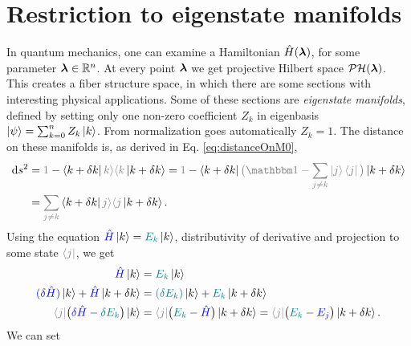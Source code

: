 \section{Restriction to eigenstate manifolds}
In quantum mechanics, one can examine a Hamiltonian $\hat{H}({\bm\lambda})$, for some parameter ${\bm\lambda}\in \mathbb{R}^n$. At every point ${\bm\lambda}$ we get projective Hilbert space $\mathcal{PH}({\bm\lambda})$. This creates a fiber structure space, in which there are some sections with interesting physical applications. Some of these sections are \emph{eigenstate manifolds}, defined by setting only one non-zero coefficient $Z_k$ in eigenbasis $\ket{\psi}=\sum_{k=0}^n Z_k \ket{k}$. From normalization goes automatically $Z_k=1$. The distance on these manifolds is, as derived in Eq. \ref{eq:distanceOnM0},
\begin{equation}
    \begin{split}
        \d s^2 &= \textcolor{gray}{1}-\bra{k+\delta k}\textcolor{gray}{k\rangle \langle k}\ket{k+\delta k}=\textcolor{gray}{1}-\bra{k+\delta k}\textcolor{gray}{\big(\Id-\sum_{j\neq k} \ket{j}\bra{j}\big)}\ket{k+\delta k} \\
        &= \textcolor{gray}{\sum_{j\neq k}}\bra{k+\delta k}\textcolor{gray}{j\rangle \langle j}\ket{k+\delta k}.
        \label{eq:dsDerivation}
    \end{split}
\end{equation}
Using the \Schrodinger equation $\textcolor{blue}{\HH}\ket{k}=\textcolor{teal}{E_k} \ket{k}$, distributivity of derivative and projection to some state $\textcolor{gray}{\bra{j}}$, we get
\begin{equation}
    \begin{split}
        \textcolor{blue}{\HH}\ket{k} &= \textcolor{teal}{E_k}\ket{k}\\
        \textcolor{blue}{(\delta \HH)}\ket{k} +\textcolor{blue}{\HH}\ket{k+\delta k} &=\textcolor{teal}{(\delta E_k)}\ket{k} +\textcolor{teal}{E_k}\ket{k+\delta k}\\
         \textcolor{gray}{\bra{j}}\big(\textcolor{blue}{\delta \HH}-\textcolor{teal}{\delta E_k}\big)\ket{k}&=\textcolor{gray}{\bra{j}}\big(\textcolor{teal}{E_k}-\textcolor{blue}{\HH}\big)\ket{k+\delta k}=\textcolor{gray}{\bra{j}}\big(\textcolor{teal}{E_k}-\textcolor{blue}{E_j}\big)\ket{k+\delta k}.
    \end{split}
\end{equation}
We can set
